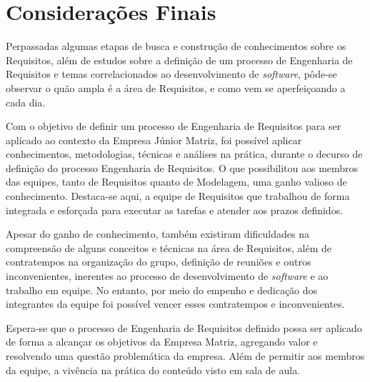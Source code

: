\chapter[Considerações Finais]{Considerações Finais}

Perpassadas algumas etapas de busca e construção de conhecimentos sobre os Requisitos, além de estudos sobre a definição de um processo de Engenharia de Requisitos e temas correlacionados ao desenvolvimento de \textit{software}, pôde-se observar o quão ampla é a área de Requisitos, e como vem se aperfeiçoando a cada dia.

Com o objetivo de definir um processo de Engenharia de Requisitos para ser aplicado ao contexto da Empresa Júnior Matriz, foi possível aplicar conhecimentos, metodologias, técnicas e análises na prática, durante o decurso de definição do processo Engenharia de Requisitos. O que possibilitou aos membros das equipes, tanto de Requisitos quanto de Modelagem, uma ganho valioso de conhecimento. Destaca-se aqui, a equipe de Requisitos que trabalhou de forma integrada e esforçada para executar as tarefas e atender aos prazos definidos.

Apesar do ganho de conhecimento, também existiram dificuldades na compreensão de alguns conceitos e técnicas na área de Requisitos, além de contratempos na organização do grupo, definição de reuniões e outros inconvenientes, inerentes ao processo de desenvolvimento de \textit{software} e ao trabalho em equipe. No entanto, por meio do empenho e dedicação dos integrantes da equipe foi possível vencer esses contratempos e inconvenientes.

Espera-se que o processo de Engenharia de Requisitos definido possa ser aplicado de forma a alcançar os objetivos da Empresa Matriz, agregando valor e resolvendo uma questão problemática da empresa. Além de permitir aos membros da equipe, a vivência na prática do conteúdo visto em sala de aula.